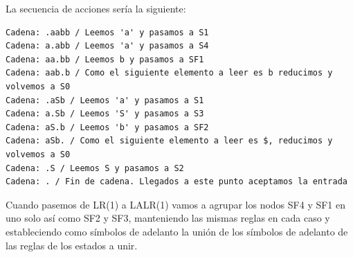 \begin{problem}
\ppart
La secuencia de acciones sería la siguiente:
\begin{verbatim}
Cadena: .aabb / Leemos 'a' y pasamos a S1
Cadena: a.abb / Leemos 'a' y pasamos a S4
Cadena: aa.bb / Leemos b y pasamos a SF1
Cadena: aab.b / Como el siguiente elemento a leer es b reducimos y volvemos a S0
Cadena: .aSb / Leemos 'a' y pasamos a S1
Cadena: a.Sb / Leemos 'S' y pasamos a S3
Cadena: aS.b / Leemos 'b' y pasamos a SF2
Cadena: aSb. / Como el siguiente elemento a leer es $, reducimos y volvemos a S0
Cadena: .S / Leemos S y pasamos a S2
Cadena: . / Fin de cadena. Llegados a este punto aceptamos la entrada
\end{verbatim}

\ppart
Cuando pasemos de LR(1) a LALR(1) vamos a agrupar los nodos SF4 y SF1 en uno solo así como SF2 y SF3, manteniendo las mismas reglas en cada caso y estableciendo como símbolos de adelanto la unión de los símbolos de adelanto de las reglas de los estados a unir.
\end{problem}

